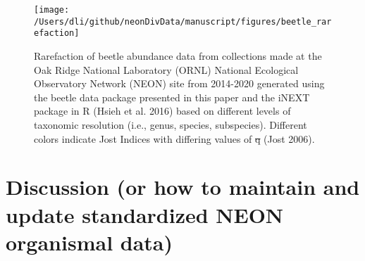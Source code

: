 \documentclass[
  12pt,
]{article}
\providecommand{\DIFaddtex}[1]{{\protect\color{blue}\uwave{#1}}} %
\providecommand{\DIFdeltex}[1]{{\protect\color{red}\sout{#1}}}                      %
\providecommand{\DIFaddFL}[1]{\DIFadd{#1}} %
\providecommand{\DIFdelFL}[1]{\DIFdel{#1}} %
\providecommand{\DIFaddbeginFL}{} %
\providecommand{\DIFaddendFL}{} %
\providecommand{\DIFdelbeginFL}{} %
\providecommand{\DIFdelendFL}{} %
\providecommand{\DIFadd}[1]{\texorpdfstring{\DIFaddtex{#1}}{#1}} %
\providecommand{\DIFdel}[1]{\texorpdfstring{\DIFdeltex{#1}}{}} %
\newcommand{\DIFscaledelfig}{0.5}
\newlength{\DIFdelgraphicswidth} %
\newlength{\DIFdelgraphicsheight} %
\newcommand{\DIFaddincludegraphics}[2][]{{\color{blue}\fbox{\DIFOincludegraphics[#1]{#2}}}} %
\newcommand{\DIFdelincludegraphics}[2][]{%
\sbox{\DIFdelgraphicsbox}{\DIFOincludegraphics[#1]{#2}}%
\settoboxwidth{\DIFdelgraphicswidth}{\DIFdelgraphicsbox} %
\settoboxtotalheight{\DIFdelgraphicsheight}{\DIFdelgraphicsbox} %
\scalebox{\DIFscaledelfig}{%
\parbox[b]{\DIFdelgraphicswidth}{\usebox{\DIFdelgraphicsbox}\\[-\baselineskip] \rule{\DIFdelgraphicswidth}{0em}}\llap{\resizebox{\DIFdelgraphicswidth}{\DIFdelgraphicsheight}{%
\setlength{\unitlength}{\DIFdelgraphicswidth}%
\begin{picture}(1,1)%
\thicklines\linethickness{2pt} %
{\color[rgb]{1,0,0}\put(0,0){\framebox(1,1){}}}%
{\color[rgb]{1,0,0}\put(0,0){\line( 1,1){1}}}%
{\color[rgb]{1,0,0}\put(0,1){\line(1,-1){1}}}%
\end{picture}%
}\hspace*{3pt}}} %
} %
\DeclareRobustCommand{\DIFaddbeginFL}{\DIFOaddbeginFL \let\includegraphics\DIFaddincludegraphics} %
\DeclareRobustCommand{\DIFaddendFL}{\DIFOaddendFL \let\includegraphics\DIFOincludegraphics} %
\DeclareRobustCommand{\DIFdelbeginFL}{\DIFOdelbeginFL \let\includegraphics\DIFdelincludegraphics} %
\DeclareRobustCommand{\DIFdelendFL}{\DIFOaddendFL \let\includegraphics\DIFOincludegraphics} %
\begin{document}
\begin{figure}

{\centering \DIFdelbeginFL %
\DIFdelendFL \DIFaddbeginFL \texttt{[image: /Users/dli/github/neonDivData/manuscript/figures/beetle\_rarefaction]} 
\DIFaddendFL 

}

\caption{Rarefaction of beetle abundance data from collections made at the Oak Ridge National Laboratory (ORNL) National Ecological Observatory Network (NEON) site from 2014-2020 generated using the beetle data package presented in this paper and the iNEXT package in R (Hsieh et al. 2016) based on different levels of taxonomic resolution (i.e., genus, species, subspecies). Different colors indicate Jost Indices with differing values of \DIFdelbeginFL \DIFdelFL{q }\DIFdelendFL \DIFaddbeginFL \emph{\DIFaddFL{q}} \DIFaddendFL (Jost 2006).}\label{fig:Fig3Curve}
\end{figure}

\hypertarget{discussion-or-how-to-maintain-and-update-standardized-neon-organismal-data}{%
\section{Discussion (or how to maintain and update standardized NEON organismal data)}\label{discussion-or-how-to-maintain-and-update-standardized-neon-organismal-data}}
\end{document}
